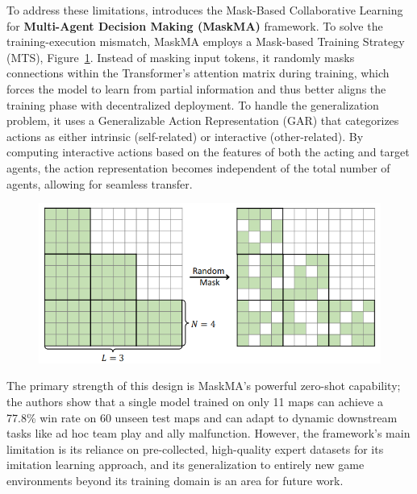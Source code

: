 To address these limitations, \parencite{maskma} introduces the Mask-Based Collaborative Learning for \textbf{Multi-Agent Decision Making (MaskMA) } framework. To solve the training-execution mismatch, MaskMA employs a Mask-based Training Strategy (MTS), Figure~\ref{fig:MTS_MaskMa}. Instead of masking input tokens, it randomly masks connections within the Transformer's attention matrix during training, which forces the model to learn from partial information and thus better aligns the training phase with decentralized deployment. To handle the generalization problem, it uses a Generalizable Action Representation (GAR) that categorizes actions as either intrinsic (self-related) or interactive (other-related). By computing interactive actions based on the features of both the acting and target agents, the action representation becomes independent of the total number of agents, allowing for seamless transfer.
\begin{figure}[H]
    \begin{minipage}{0.5\textwidth}
       \includegraphics[width=\linewidth]{img_pfe/attention_matrix_MTS_MaskMa.PNG}
    \end{minipage}
    \hspace{0.07\textwidth} 
    \begin{minipage}{0.4\textwidth}

        \label{fig:MTS_MaskMa}
    \end{minipage}

\end{figure}
The primary strength of this design is MaskMA's powerful zero-shot capability; the authors show that a single model trained on only 11 maps can achieve a 77.8\% win rate on 60 unseen test maps and can adapt to dynamic downstream tasks like ad hoc team play and ally malfunction. However, the framework's main limitation is its reliance on pre-collected, high-quality expert datasets for its imitation learning approach, and its generalization to entirely new game environments beyond its training domain is an area for future work.

